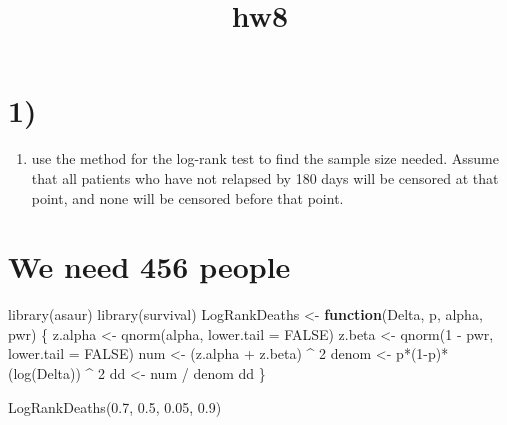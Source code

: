 \documentclass[
]{article}
\title{hw8}
\author{}
\date{\vspace{-2.5em}}
\newenvironment{Shaded}{\begin{snugshade}}{\end{snugshade}}
\newcommand{\AttributeTok}[1]{\textcolor[rgb]{0.77,0.63,0.00}{#1}}
\newcommand{\ConstantTok}[1]{\textcolor[rgb]{0.00,0.00,0.00}{#1}}
\newcommand{\ControlFlowTok}[1]{\textcolor[rgb]{0.13,0.29,0.53}{\textbf{#1}}}
\newcommand{\DecValTok}[1]{\textcolor[rgb]{0.00,0.00,0.81}{#1}}
\newcommand{\FloatTok}[1]{\textcolor[rgb]{0.00,0.00,0.81}{#1}}
\newcommand{\FunctionTok}[1]{\textcolor[rgb]{0.00,0.00,0.00}{#1}}
\newcommand{\NormalTok}[1]{#1}
\newcommand{\OtherTok}[1]{\textcolor[rgb]{0.56,0.35,0.01}{#1}}
\newcommand{\SpecialCharTok}[1]{\textcolor[rgb]{0.00,0.00,0.00}{#1}}
\providecommand{\tightlist}{%
  \setlength{\itemsep}{0pt}\setlength{\parskip}{0pt}}
\begin{document}
\maketitle

\hypertarget{section}{%
\section{1)}\label{section}}

\begin{enumerate}
\def\labelenumi{\alph{enumi}.}
\tightlist
\item
  use the method for the log-rank test to find the sample size needed.
  Assume that all patients who have not relapsed by 180 days will be
  censored at that point, and none will be censored before that point.
\end{enumerate}

\hypertarget{we-need-456-people}{%
\section{We need 456 people}\label{we-need-456-people}}

\begin{Shaded}
\begin{Highlighting}[]
\FunctionTok{library}\NormalTok{(asaur)}
\FunctionTok{library}\NormalTok{(survival)}
\NormalTok{LogRankDeaths }\OtherTok{\textless{}{-}} \ControlFlowTok{function}\NormalTok{(Delta, p, alpha, pwr) \{}
\NormalTok{  z.alpha }\OtherTok{\textless{}{-}} \FunctionTok{qnorm}\NormalTok{(alpha, }\AttributeTok{lower.tail =} \ConstantTok{FALSE}\NormalTok{)}
\NormalTok{  z.beta }\OtherTok{\textless{}{-}} \FunctionTok{qnorm}\NormalTok{(}\DecValTok{1} \SpecialCharTok{{-}}\NormalTok{ pwr, }\AttributeTok{lower.tail =} \ConstantTok{FALSE}\NormalTok{)}
\NormalTok{  num }\OtherTok{\textless{}{-}}\NormalTok{ (z.alpha }\SpecialCharTok{+}\NormalTok{ z.beta) }\SpecialCharTok{\^{}} \DecValTok{2}
\NormalTok{  denom }\OtherTok{\textless{}{-}}\NormalTok{ p}\SpecialCharTok{*}\NormalTok{(}\DecValTok{1}\SpecialCharTok{{-}}\NormalTok{p)}\SpecialCharTok{*}\NormalTok{(}\FunctionTok{log}\NormalTok{(Delta)) }\SpecialCharTok{\^{}} \DecValTok{2}
\NormalTok{  dd }\OtherTok{\textless{}{-}}\NormalTok{ num }\SpecialCharTok{/}\NormalTok{ denom}
\NormalTok{  dd}
\NormalTok{\}}

\FunctionTok{LogRankDeaths}\NormalTok{(}\FloatTok{0.7}\NormalTok{, }\FloatTok{0.5}\NormalTok{, }\FloatTok{0.05}\NormalTok{, }\FloatTok{0.9}\NormalTok{)}
\end{Highlighting}
\end{Shaded}
\end{document}

